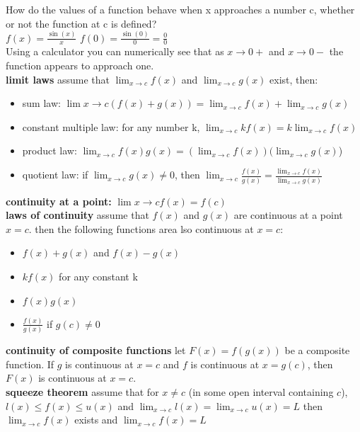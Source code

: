\documentclass{article}
\begin{document}
How do the values of a function behave when x approaches a number c, whether or not the function at c is defined?\\
$f(x) = \frac{\sin(x)}{x}$
$f(0) = \frac{\sin(0)}{0} = \frac{0}{0}$\\
Using a calculator you can numerically see that as $x \to 0+$ and $x \to 0-$ the function appears to approach one.\\

\textbf{limit laws} assume that $\lim_{x \to c}f(x)$ and $\lim_{x \to c}g(x)$ exist, then:
	\begin{itemize}
		\item sum law: $\lim{x \to c}(f(x) + g(x)) = \lim_{x \to c}f(x) + \lim_{x \to c}g(x)$
		\item constant multiple law: for any number k, $\lim_{x \to c}kf(x) = k\lim_{x \to c}f(x)$
		\item product law: $\lim_{x \to c}f(x)g(x) = (\lim_{x \to c}f(x))(\lim_{x \to c}g(x)$)
		\item quotient law: if $\lim_{x \to c}g(x) \neq 0$, then $\lim_{x \to c}\frac{f(x)}{g(x)} = \frac{\lim_{x \to c}f(x)}{\lim_{x \to c}g(x)}$
	\end{itemize}

\textbf{continuity at a point:} $\lim{x \to c}f(x) = f(c)$\\

\textbf{laws of continuity} assume that $f(x)$ and $g(x)$ are continuous at a point $x = c$. then the following functions area lso continuous at $x = c$:
	\begin{itemize}
		\item $f(x) + g(x)$ and $f(x) - g(x)$
		\item $kf(x)$ for any constant k
		\item $f(x)g(x)$
		\item $\frac{f(x)}{g(x)}$ if $g(c) \neq 0$
	\end{itemize}

\textbf{continuity of composite functions} let $F(x) = f(g(x))$ be a composite function. If $g$ is continuous at $x = c$ and $f$ is continuous at $x = g(c)$, then $F(x)$ is continuous at $x = c$.\\

\textbf{squeeze theorem} assume that for $x \neq c$ (in some open interval containing $c$), $l(x) \leq f(x) \leq u(x)$ and $\lim_{x \to c}l(x) = \lim_{x \to c}u(x) = L$ then $\lim_{x \to c}f(x)$ exists and $\lim_{x \to c}f(x) = L$\\
\end{document}
